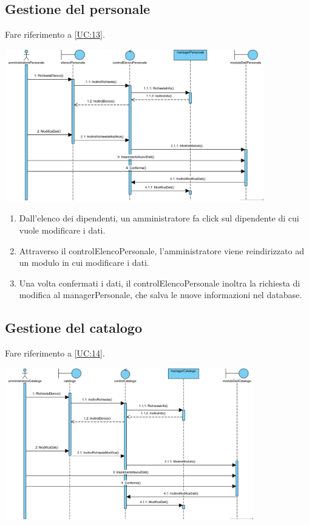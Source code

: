 \documentclass[12pt,a4paper]{article}
\begin{document}
\newpage

\subsection{Gestione del personale}

Fare riferimento a \ref{UC:13}.

\includegraphics[height=250px]{SequenceDiagram/GestionePersonale}

\begin{enumerate}
\item Dall'elenco dei dipendenti, un amministratore fa click sul dipendente di cui vuole modificare i dati.
\item Attraverso il controlElencoPersonale, l'amministratore viene reindirizzato ad un modulo in cui modificare i dati.
\item Una volta confermati i dati, il controlElencoPersonale inoltra la richiesta di modifica al managerPersonale, che salva le nuove informazioni nel database.
\end{enumerate}

\newpage

\subsection{Gestione del catalogo}

Fare riferimento a \ref{UC:14}.

\includegraphics[height=250px]{SequenceDiagram/GestioneCatalogo}
\end{document}
